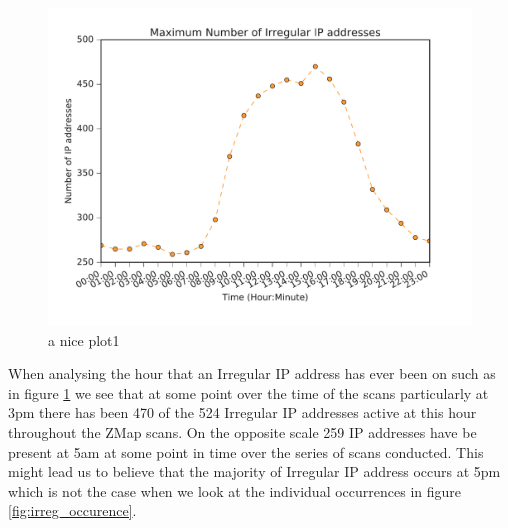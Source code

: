 \documentclass[a4wide,leqno,12pt]{report}
\begin{document}
\begin{figure}[h!]
\includegraphics[scale=.5]{pdf_images/MaximumNumberOfIrregularIPaddressesInAnAverageDay}
\caption{a nice plot1}
\label{fig:irreg_ips}
\end{figure}
When analysing the hour that an Irregular IP address has ever been on such as in figure \ref{fig:irreg_ips} we see that at some point over the time of the scans particularly at 3pm there has been 470 of the 524 Irregular IP addresses active at this hour throughout the ZMap scans. On the opposite scale 259 IP addresses have be present at 5am at some point in time over the series of scans conducted. This might lead us to believe that the majority of Irregular IP address occurs at 5pm which is not the case when we look at the individual occurrences in figure \ref{fig:irreg_occurence}.
\end{document}
